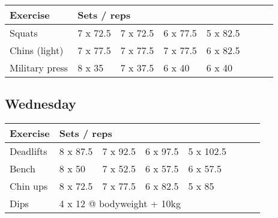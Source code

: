 \documentclass[12pt, a4paper]{article}%
\begin{document}
  \begin{tabular}{l|lllllll}
  \hspace{0.75em} \textbf{Exercise} & \multicolumn{ 7 }{l}{ \textbf{Sets / reps} } \\ \hline

            \hspace{0.75em} Squats
            & 7 x 72.5
            & 7 x 72.5
            & 6 x 77.5
            & 5 x 82.5
            & 
            & 
            & 
            \\


            \hspace{0.75em} Chins (light)
            & 7 x 77.5
            & 7 x 77.5
            & 7 x 77.5
            & 6 x 82.5
            & 
            & 
            & 
            \\


            \hspace{0.75em} Military press
            & 8 x 35
            & 7 x 37.5
            & 6 x 40
            & 6 x 40
            & 
            & 
            & 
            \\


  \end{tabular}

  \subsection*{\hspace{0.5em} Wednesday }


  \begin{tabular}{l|lllllll}
  \hspace{0.75em} \textbf{Exercise} & \multicolumn{ 7 }{l}{ \textbf{Sets / reps} } \\ \hline

            \hspace{0.75em} Deadlifts
            & 8 x 87.5
            & 7 x 92.5
            & 6 x 97.5
            & 5 x 102.5
            & 
            & 
            & 
            \\


            \hspace{0.75em} Bench
            & 8 x 50
            & 7 x 52.5
            & 6 x 57.5
            & 6 x 57.5
            & 
            & 
            & 
            \\


            \hspace{0.75em} Chin ups
            & 8 x 72.5
            & 7 x 77.5
            & 6 x 82.5
            & 5 x 85
            & 
            & 
            & 
            \\


   \hspace{0.75em} Dips &  \multicolumn{ 7 }{l}{ 4 x 12 @ bodyweight + 10kg } \\
  \end{tabular}
\end{document}
